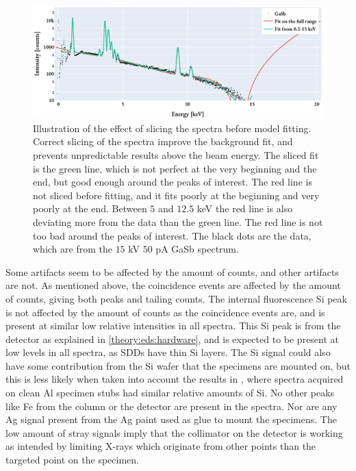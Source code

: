 \begin{figure}[htbp]
    \centering
    \includegraphics[width=0.85\linewidth]{figures/discussion/model_slicing_fit.pdf}
    \caption{
        Illustration of the effect of slicing the spectra before model fitting.
        Correct slicing of the spectra improve the background fit, and prevents unpredictable results above the beam energy.
        The sliced fit is the green line, which is not perfect at the very beginning and the end, but good enough around the peaks of interest.
        The red line is not sliced before fitting, and it fits poorly at the beginning and very poorly at the end.
        Between $5$ and $12.5$ keV the red line is also deviating more from the data than the green line.
        The red line is not too bad around the peaks of interest.
        The black dots are the data, which are from the $15$ kV $50$ pA GaSb spectrum.
    }
    \label{fig:discussion:model_slicing_fit}
\end{figure}



Some artifacts seem to be affected by the amount of counts, and other artifacts are not.
As mentioned above, the coincidence events are affected by the amount of counts, giving both peaks and tailing counts.
The internal fluorescence Si peak is not affected by the amount of counts as the coincidence events are, and is present at similar low relative intensities in all spectra.
This Si peak is from the detector as explained in \cref{theory:eds:hardware}, and is expected to be present at low levels in all spectra, as SDDs have thin Si layers.
The Si signal could also have some contribution from the Si wafer that the specimens are mounted on, but this is less likely when taken into account the results in \cite{project_report}, where spectra acquired on clean Al specimen stubs had similar relative amounts of Si.
No other peaks like Fe from the column or the detector are present in the spectra.
Nor are any Ag signal present from the Ag paint used as glue to mount the specimens.
The low amount of stray signals imply that the collimator on the detector is working as intended by limiting X-rays which originate from other points than the targeted point on the specimen.


